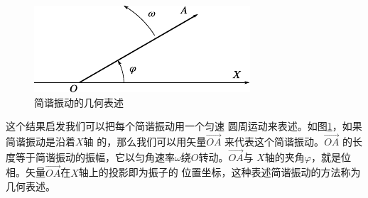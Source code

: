 \begin{figure}
  \centering
  \includegraphics{figure/fig07.07}
  \caption{简谐振动的几何表述}
  \label{fig:07.07}
\end{figure}
这个结果启发我们可以把每个简谐振动用一个匀速
圆周运动来表述。如图\ref{fig:07.07}，如果简谐振动是沿着$ X $轴
的，那么我们可以用矢量$ \vec{ OA } $
来代表这个简谐振动。$ \vec{ OA } $
的长度等于简谐振动的振幅，它以匀角速率$ \omega $绕$ O $转动。$ \vec{ OA } $与
$ X $轴的夹角$ \varphi $，就是位相。矢量$ \vec{ OA } $在$ X $轴上的投影即为振子的
位置坐标，这种表述简谐振动的方法称为几何表述。

